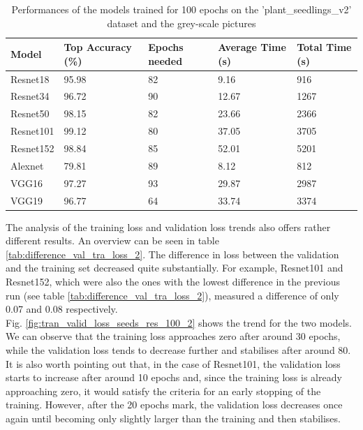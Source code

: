\begin{table}[htbp]
\centering
\begin{tabular}{ p{2cm} p{4cm} p{3cm} p{3cm} p{2cm}  }
 Model& Top Accuracy (\%) & Epochs needed &Average Time (s)&Total Time (s)\\
 \hline
Resnet18&95.98&82&9.16&916\\
Resnet34&96.72&90&12.67&1267\\
Resnet50&98.15&82&23.66&2366\\
Resnet101&99.12&80&37.05&3705\\
Resnet152&98.84&85&52.01&5201\\
Alexnet&79.81&89&8.12&812\\
VGG16&97.27&93&29.87&2987\\
VGG19&96.77&64&33.74&3374\\
 \hline
\end{tabular}
\caption{Performances of the models trained for 100 epochs on the 'plant\_seedlings\_v2' dataset and the grey-scale pictures}
\label{tab:performances_seeds_gray}
\end{table}

The analysis of the training loss and validation loss trends also offers rather different results. An overview can be seen in table \ref{tab:difference_val_tra_loss_2}. The difference in loss between the validation and the training set decreased quite substantially. For example, Resnet101 and Resnet152, which were also the ones with the lowest difference in the previous run (see table \ref{tab:difference_val_tra_loss_2}), measured a difference of only 0.07 and 0.08 respectively. \\
Fig. \ref{fig:tran_valid_loss_seeds_res_100_2} shows the trend for the two models. We can observe that the training loss approaches zero after around 30 epochs, while the validation loss tends to decrease further and stabilises after around 80. It is also worth pointing out that, in the case of Resnet101, the validation loss starts to increase after around 10 epochs and, since the training loss is already approaching zero, it would satisfy the criteria for an early stopping of the training. However, after the 20 epochs mark, the validation loss decreases once again until becoming only slightly larger than the training and then stabilises. 

